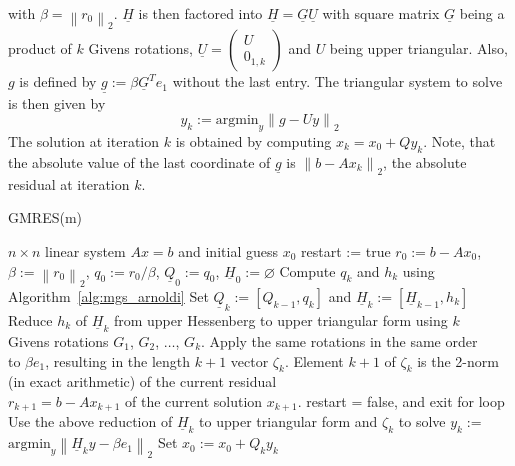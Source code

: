 \documentclass{scrartcl}
\numberwithin{equation}{section}
\newcommand{\norm}[1]{\left\lVert#1\right\rVert}
\begin{document}
with $\beta = \norm{r_0}_2$.
$\underline{H}$ is then factored into $\underline{H} = \underline{G}\underline{U}$ with square matrix $\underline{G}$ being a product of $k$ Givens rotations, $\underline{U} = 
\begin{pmatrix}
	U \\
	0_{1, k}
\end{pmatrix}$
and $U$ being upper triangular. Also, $g$ is defined by $\underline{g} := \beta \underline{G}^T e_1$ without the last entry. The triangular system to solve is then given by
\begin{equation*}
	y_k := \text{argmin}_y \norm{g - U y}_2
\end{equation*}
The solution at iteration $k$ is obtained by computing $x_k = x_0 + Qy_k$. Note, that the absolute value of the last coordinate of $\underline{g}$ is $\norm{b - Ax_k}_2$, the absolute residual at iteration $k$.

\begin{algorithm}
\caption{GMRES(m)}
\label{alg:gmres(m)}
\begin{algorithmic}[1]
    \REQUIRE $n \times n$ linear system $Ax = b$ and initial guess $x_0$
    \STATE restart := true
    	\STATE $r_0:=b - Ax_0$, $\beta := \norm{r_0}_2$, $q_0 := r_0/\beta$, $\underline{Q}_0 := q_0$, $\underline{H}_0 := \varnothing$
			\STATE Compute $q_k$ and $h_k$ using Algorithm~\ref{alg:mgs_arnoldi}
			\STATE Set $\underline{Q}_k := [Q_{k-1},q_k]$ and $\underline{H}_k := [\underline{H}_{k -1}, h_k]$
			\STATE Reduce ${h_k}$ of $\underline{H}_k$ from upper Hessenberg to upper triangular form using $k$ \\
		\hspace{\algorithmicindent} Givens rotations $G_1$, $G_2$, $ \ldots$, $G_{k}$. Apply the same rotations in the same order \\ 
		\hspace{\algorithmicindent} to $\beta e_1$,  resulting in the length $k + 1$ vector $\zeta_{k}$.
			\STATE Element $k + 1$ of $\zeta_k$ is the 2-norm (in exact arithmetic) of the current residual \\
\hspace{\algorithmicindent} $r_{k + 1} = b - Ax_{k + 1}$ of the current solution $x_{k + 1}$.
			\STATE restart = false, and exit for loop		
		\ENDIF
		\ENDFOR
		\STATE Use the above reduction of $\underline{H}_k$ to upper triangular form and $\zeta_k$ to solve $y_k :=$ \\ \hspace{\algorithmicindent} $\text{argmin}_{y} \norm{\underline{H}_k y - \beta e_1}_2$
		\STATE Set $x_0 := x_0 + Q_k y_k$
	\ENDWHILE 
\end{algorithmic}
\end{algorithm}
\end{document}
